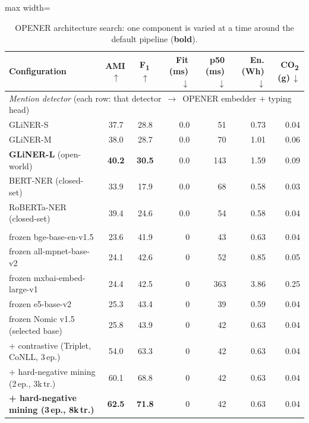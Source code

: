 \begin{table}[tp]
\centering
\caption{OPENER architecture search: one component is varied at a time around the default pipeline (\textbf{bold}).}
\label{tab:ablation}
\small
\begin{adjustbox}{max width=\textwidth}
\begin{threeparttable}
\begin{tabular}{lccrrrr}
\toprule
Configuration & AMI\,$\uparrow$ & F\textsubscript{1}\,$\uparrow$ & Fit\,(ms)\,$\downarrow$ & p50\,(ms)\,$\downarrow$ & En.\,(Wh)\,$\downarrow$ & CO\textsubscript{2}\,(g)\,$\downarrow$ \\
\midrule
\multicolumn{7}{l}{\emph{Mention detector} (each row: that detector \,$\rightarrow$\, OPENER embedder $+$ typing head)} \\
\quad GLiNER-S                       & 37.7 & 28.8 & 0.0 & 51 & 0.73 & 0.04 \\
\quad GLiNER-M                       & 38.0 & 28.7 & 0.0 & 70 & 1.01 & 0.06 \\
\quad \textbf{GLiNER-L} (open-world) & \textbf{40.2} & \textbf{30.5} & 0.0 & 143 & 1.59 & 0.09 \\
\quad BERT-NER (closed-set) \cite{devlin2019bert}      & 33.9 & 17.9 & 0.0 & 68 & 0.58 & 0.03 \\
\quad RoBERTa-NER (closed-set) \cite{liu2019roberta}   & 39.4 & 24.6 & 0.0 & 54 & 0.58 & 0.04 \\
\addlinespace
\multicolumn{7}{l}{\emph{Entity embedder}$^{\ast}$} \\
\quad frozen bge-base-en-v1.5 \cite{xiao2024cpack}      & 23.6 & 41.9 & 0 & 43 & 0.63 & 0.04 \\
\quad frozen all-mpnet-base-v2 \cite{song2020mpnet}     & 24.1 & 42.6 & 0 & 52 & 0.85 & 0.05 \\
\quad frozen mxbai-embed-large-v1 \cite{li2024aoe}      & 24.4 & 42.5 & 0 & 363 & 3.86 & 0.25 \\
\quad frozen e5-base-v2 \cite{wang2022e5}               & 25.3 & 43.4 & 0 & 39 & 0.59 & 0.04 \\
\quad frozen Nomic v1.5 (selected base)                 & 25.8 & 43.9 & 0 & 42 & 0.63 & 0.04 \\
\quad + contrastive (Triplet, CoNLL, 3\,ep.)            & 54.0 & 63.3 & 0 & 42 & 0.63 & 0.04 \\
\quad + hard-negative mining (2\,ep., 3k\,tr.)          & 60.1 & 68.8 & 0 & 42 & 0.63 & 0.04 \\
\quad \textbf{+ hard-negative mining (3\,ep., 8k\,tr.)} & \textbf{62.5} & \textbf{71.8} & 0 & 42 & 0.63 & 0.04 \\

\end{tabular}
\end{threeparttable}
\end{adjustbox}
\end{table}
